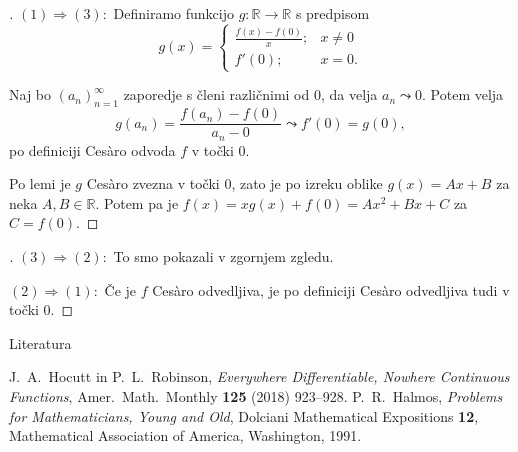 \documentclass[10pt,hyperref={unicode}]{beamer}
\newenvironment{dokaz}{\begin{proof}[\bfseries\upshape\proofname]}{\end{proof}}
\begin{document}
\begin{frame}
    \begin{dokaz}\renewcommand{\qedsymbol}{}
        $(1) \Rightarrow (3): $ Definiramo funkcijo $g: \mathbb{R} \rightarrow \mathbb{R}$ s predpisom 
        $$
        g(x) = \begin{cases}
            \frac{f(x)-f(0)}{x}; & x \neq 0\\
            f'(0); & x = 0.
        \end{cases}
        $$
        \pause

        Naj bo $(a_n)_{n=1}^{\infty}$ zaporedje s členi različnimi od $0$, da velja $a_n \leadsto 0$. Potem velja 
        $$g(a_n) = \frac{f(a_n)-f(0)}{a_n-0} \leadsto f'(0) = g(0),$$
        po definiciji Ces\`{a}ro odvoda $f$ v točki $0$. 
        \pause
        
        Po lemi je $g$ Ces\`{a}ro zvezna v točki $0$, zato je po izreku oblike $g(x) = Ax + B$ za neka $A, B \in \mathbb{R}$. Potem pa je 
        $f(x) = xg(x) + f(0) = Ax^2 + Bx + C$ za $C = f(0)$.
    \end{dokaz}
\end{frame}

\begin{frame}
    \begin{dokaz}
        $(3) \Rightarrow (2): $ To smo pokazali v zgornjem zgledu.
        \pause

        \medskip
        $(2) \Rightarrow (1): $ Če je $f$ Ces\`{a}ro odvedljiva, je po definiciji Ces\`{a}ro odvedljiva tudi v točki $0$.
    \end{dokaz}
\end{frame}

\begin{frame}{Literatura}
    \begin{thebibliography}{1}
        J.~A.~Hocutt in P.~L.~Robinson, \emph{Everywhere Differentiable, Nowhere Continuous Functions}, Amer.~Math.~Monthly \textbf{125} (2018) 923--928.
        P.~R.~Halmos, \emph{Problems for Mathematicians, Young and Old}, Dolciani Mathematical Expositions \textbf{12}, Mathematical Association of America, Washington, 1991.
    \end{thebibliography}
\end{frame}
\end{document}
